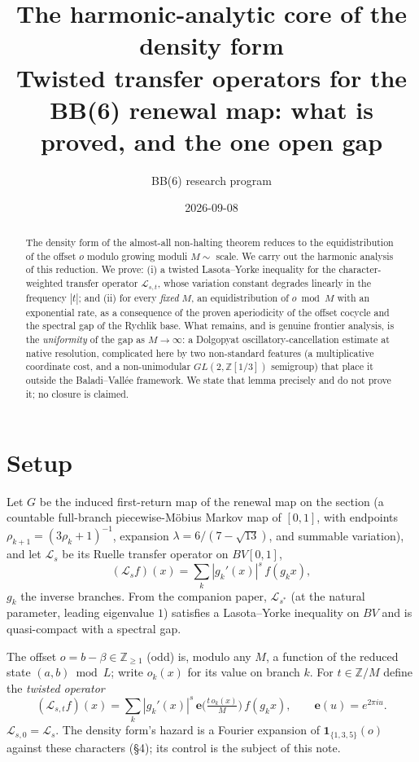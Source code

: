 \documentclass[11pt]{article}
\title{\bfseries The harmonic-analytic core of the density form\\[3pt]
\large Twisted transfer operators for the BB(6) renewal map: what is proved, and the one open gap}
\author{BB(6) research program}\date{2026-09-08}
\theoremstyle{definition}\newtheorem{definition}{Definition}
\theoremstyle{remark}\newtheorem{remark}{Remark}
\newcommand{\Z}{\mathbb{Z}}\newcommand{\Rr}{\mathbb{R}}\newcommand{\C}{\mathbb{C}}
\newcommand{\Lop}{\mathcal L}\newcommand{\var}{\operatorname{var}}\newcommand{\e}{\mathbf e}
\begin{document}
\maketitle
\begin{abstract}
The density form of the almost-all non-halting theorem reduces to the
equidistribution of the offset $o$ modulo growing moduli $M\sim$ scale. We
carry out the harmonic analysis of this reduction. We prove: (i) a twisted
Lasota--Yorke inequality for the character-weighted transfer operator
$\Lop_{s,t}$, whose variation constant degrades linearly in the frequency
$|t|$; and (ii) for every \emph{fixed} $M$, an equidistribution of $o\bmod M$
with an exponential rate, as a consequence of the proven aperiodicity of the
offset cocycle and the spectral gap of the Rychlik base. What remains, and is
genuine frontier analysis, is the \emph{uniformity} of the gap as
$M\to\infty$: a Dolgopyat oscillatory-cancellation estimate at native
resolution, complicated here by two non-standard features (a multiplicative
coordinate cost, and a non-unimodular $GL(2,\Z[1/3])$ semigroup) that place it
outside the Baladi--Vall\'ee framework. We state that lemma precisely and do
not prove it; no closure is claimed.
\end{abstract}

\section{Setup}
Let $G$ be the induced first-return map of the renewal map on the section
(a countable full-branch piecewise-M\"obius Markov map of $[0,1]$, with
endpoints $\rho_{k+1}=(3\rho_k+1)^{-1}$, expansion $\lambda=6/(7-\sqrt{13})$,
and summable variation), and let $\Lop_s$ be its Ruelle transfer operator on
$BV[0,1]$,
\[
(\Lop_s f)(x)=\sum_{k}|g_k'(x)|^{s}\,f(g_k x),
\]
$g_k$ the inverse branches. From the companion paper, $\Lop_{s^\ast}$ (at the
natural parameter, leading eigenvalue $1$) satisfies a Lasota--Yorke
inequality on $BV$ and is quasi-compact with a spectral gap.

The offset $o=b-\beta\in\Z_{\ge1}$ (odd) is, modulo any $M$, a function of the
reduced state $(a,b)\bmod L$; write $o_k(x)$ for its value on branch $k$. For
$t\in\Z/M$ define the \emph{twisted operator}
\[
(\Lop_{s,t}f)(x)=\sum_k |g_k'(x)|^{s}\,\e\!\Big(\tfrac{t\,o_k(x)}{M}\Big)\,f(g_k x),
\qquad \e(u)=e^{2\pi i u}.
\]
$\Lop_{s,0}=\Lop_s$. The density form's hazard is a Fourier expansion of
$\mathbf 1_{\{1,3,5\}}(o)$ against these characters (\S4); its control is the
subject of this note.
\end{document}

